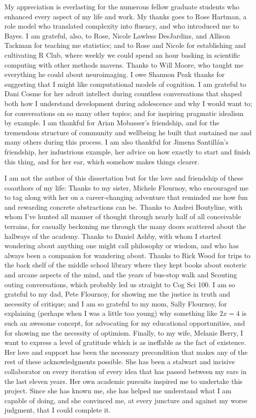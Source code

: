 My appreciation is everlasting for the numerous fellow graduate students who enhanced every aspect of my life and work.
My thanks goes to Rose Hartman, a role model who translated complexity into fluency, and who introduced me to Bayes.
I am grateful, also, to Rose, Nicole Lawless DesJardins, and Allison Tackman for teaching me statistics; and to Rose and Nicole for establishing and cultivating R Club, where weekly we could spend an hour basking in scientific computing with other methods mavens.
Thanks to Will Moore, who taught me everything he could about neuroimaging.
I owe Shannon Peak thanks for suggesting that I might like computational models of cognition.
I am grateful to Dani Cosme for her adroit intellect during countless conversations that shaped both how I understand development during adolescence and why I would want to; for conversations on so many other topics; and for inspiring pragmatic idealism by example.
I am thankful for Arian Mobasser's friendship, and for the tremendous structure of community and wellbeing he built that sustained me and many others during this process.
I am also thankful for Jimena Santillán's friendship, her industrious example, her advice on how exactly to start and finish this thing, and for her ear, which somehow makes things clearer.

I am not the author of this dissertation but for the love and friendship of these coauthors of my life:
Thanks to my sister, Michele Flournoy, who encouraged me to tag along with her on a career-changing adventure that reminded me how fun and rewarding concrete abstractions can be.
Thanks to Andrei Boutyline, with whom I've hunted all manner of thought through nearly half of all conceivable terrains, for casually beckoning me through the many doors scattered about the hallways of the academy.
Thanks to Daniel Ashby, with whom I started wondering about anything one might call philosophy or wisdom, and who has always been a companion for wandering about.
Thanks to Rick Wood for trips to the back shelf of the middle school library where they kept books about esoteric and arcane aspects of the mind, and the years of bus-stop walk and Scouting outing conversations, which probably led us straight to Cog Sci 100.
I am so grateful to my dad, Pete Flournoy, for showing me the justice in truth and necessity of critique; and I am so grateful to my mom, Sally Flournoy, for explaining (perhaps when I was a little too young) why something like $2x=4$ is such an awesome concept, for advocating for my educational opportunities, and for showing me the necessity of optimism.
Finally, to my wife, Melanie Berry, I want to express a level of gratitude which is as ineffable as the fact of existence.
Her love and support has been the necessary precondition that makes any of the rest of these acknowledgments possible.
She has been a stalwart and incisive collaborator on every iteration of every idea that has passed between my ears in the last eleven years. 
Her own academic pursuits inspired me to undertake this project.
Since she has known me, she has helped me understand what I am capable of doing, and she convinced me, at every juncture and against my worse judgment, that I could complete it.
